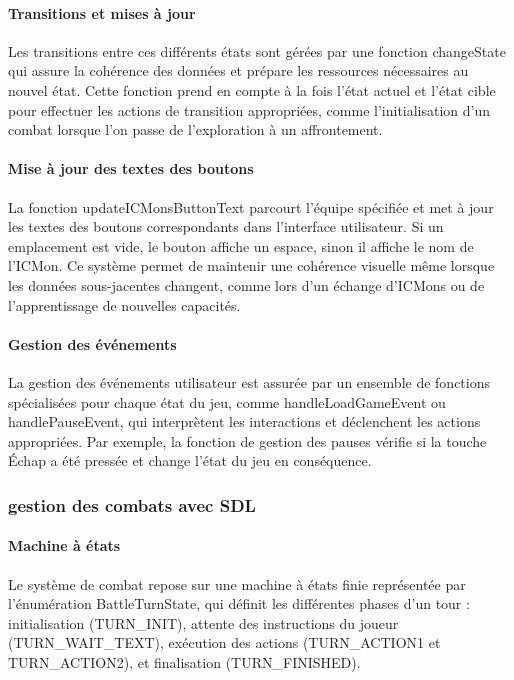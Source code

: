 \documentclass[12pt,a4paper, twoside]{article}
\begin{document}
\paragraph{Transitions et mises à jour} Les transitions entre ces différents états sont gérées par une fonction changeState qui assure la cohérence des données et prépare les ressources nécessaires au nouvel état. Cette fonction prend en compte à la fois l'état actuel et l'état cible pour effectuer les actions de transition appropriées, comme l'initialisation d'un combat lorsque l'on passe de l'exploration à un affrontement.

\paragraph{Mise à jour des textes des boutons} La fonction updateICMonsButtonText parcourt l'équipe spécifiée et met à jour les textes des boutons correspondants dans l'interface utilisateur. Si un emplacement est vide, le bouton affiche un espace, sinon il affiche le nom de l'ICMon. Ce système permet de maintenir une cohérence visuelle même lorsque les données sous-jacentes changent, comme lors d'un échange d'ICMons ou de l'apprentissage de nouvelles capacités.

\paragraph{Gestion des événements} La gestion des événements utilisateur est assurée par un ensemble de fonctions spécialisées pour chaque état du jeu, comme handleLoadGameEvent ou handlePauseEvent, qui interprètent les interactions et déclenchent les actions appropriées. Par exemple, la fonction de gestion des pauses vérifie si la touche Échap a été pressée et change l'état du jeu en conséquence.

\subsubsection{gestion des combats avec SDL}
\paragraph{Machine à états} Le système de combat repose sur une machine à états finie représentée par l'énumération BattleTurnState, qui définit les différentes phases d'un tour : initialisation (TURN\_INIT), attente des instructions du joueur (TURN\_WAIT\_TEXT), exécution des actions (TURN\_ACTION1 et TURN\_ACTION2), et finalisation (TURN\_FINISHED).
\end{document}
